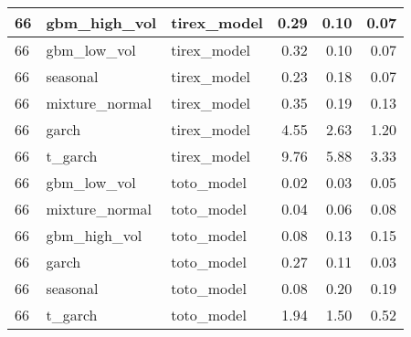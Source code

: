 {\begin{tabular}{lllrrr}
\midrule
66 & gbm\_high\_vol & tirex\_model & 0.29 & 0.10 & 0.07 \\
\midrule
66 & gbm\_low\_vol & tirex\_model & 0.32 & 0.10 & 0.07 \\
\midrule
66 & seasonal & tirex\_model & 0.23 & 0.18 & 0.07 \\
\midrule
66 & mixture\_normal & tirex\_model & 0.35 & 0.19 & 0.13 \\
\midrule
66 & garch & tirex\_model & 4.55 & 2.63 & 1.20 \\
\midrule
66 & t\_garch & tirex\_model & 9.76 & 5.88 & 3.33 \\
\midrule
66 & gbm\_low\_vol & toto\_model & 0.02 & 0.03 & 0.05 \\
\midrule
66 & mixture\_normal & toto\_model & 0.04 & 0.06 & 0.08 \\
\midrule
66 & gbm\_high\_vol & toto\_model & 0.08 & 0.13 & 0.15 \\
\midrule
66 & garch & toto\_model & 0.27 & 0.11 & 0.03 \\
\midrule
66 & seasonal & toto\_model & 0.08 & 0.20 & 0.19 \\
\midrule
66 & t\_garch & toto\_model & 1.94 & 1.50 & 0.52 \\
\bottomrule
\end{tabular}
}